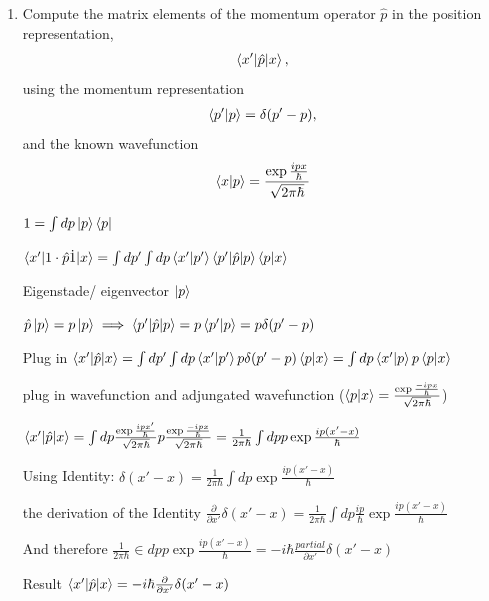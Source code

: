 \documentclass[11pt,a4paper]{scrartcl}
\begin{document}
\begin{enumerate}
\begin{calculationbox}
        \end{calculationbox}

        \item  Compute the matrix elements of the momentum operator $\hat{p}$ in the position representation,
        \begin{align*}
            \braket{x' | \hat{p} | x},
        \end{align*}
        using the momentum representation
        \begin{align}
            \braket{p'|p} = \delta(p' - p),
        \end{align}
        and the known wavefunction
        \begin{align*}
            \braket{x | p} = \frac{\exp{\frac{ipx}{\hbar}}}{\sqrt{2\pi \hbar}}
        \end{align*}

        \begin{calculationbox}
            $1 = \int dp \ket{p}\bra{p}$

            $\braket{x'|1 \cdot \hat{p} \dot 1|x} = \int dp' \int dp \braket{x'|p'} \braket{p'|\hat{p} | p} \braket{p|x}$

            \begin{calculationbox}
                Eigenstade/ eigenvector $\ket{p}$

                $\hat{p}\ket{p} = p \ket{p} \implies \braket{p'| \hat{p} | p} = p\braket{p'| p} = p \delta(p' - p)$
            \end{calculationbox}

            Plug in
            $\braket{x' | \hat{p} | x} = \int dp' \int dp \braket{x'|p'} p \delta(p'-p) \braket{p|x} = \int dp \braket{x' | p} p \braket{p | x}$

            plug in wavefunction and adjungated wavefunction ($\braket{p | x} = \frac{\exp{\frac{-ipx}{\hbar}}}{\sqrt{2\pi \hbar}}$)

            $\braket{x' | \hat{p} | x} 
            = \int dp \frac{\exp{\frac{ipx'}{\hbar}}}{\sqrt{2\pi \hbar}} p \frac{\exp{\frac{-ipx}{\hbar}}}{\sqrt{2\pi \hbar}}
            = \frac{1}{2 \pi \hbar} \int dp p \exp{\frac{ip (x'-x)}{\hbar}}
            $

            Using Identity: $\delta(x' - x) = \frac{1}{2\pi\hbar} \int dp \exp{\frac{i p (x' - x)}{\hbar}}$

            the derivation of the Identity $\frac{\partial}{\partial x'} \delta(x' - x) = \frac{1}{2\pi\hbar} \int dp \frac{ip}{\hbar} \exp{\frac{i p (x' - x)}{\hbar}}$

            And therefore $\frac{1}{2\pi \hbar} \in dp p \exp{\frac{i p (x' - x)}{\hbar}} = - i \hbar \frac{partial}{\partial x'} \delta(x' - x)$

            Result $\braket{x' | \hat{p} | x} = - i \hbar \frac{\partial}{\partial x'} \delta(x' - x)$

        \end{calculationbox}

    \end{enumerate}
\end{document}
